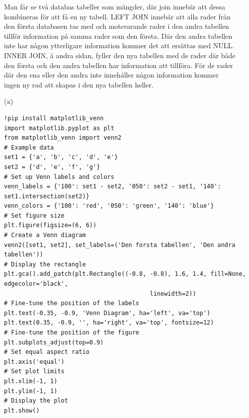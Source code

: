\documentclass[]{article}
\begin{document}
Man får se två databas tabeller som mängder, där join innebär att dessa \\
kombineras för att få en ny tabell. LEFT JOIN innebär att alla rader från \\
den första databasen tas med och motsvarande rader i den andra tabellen \\
tillför information på samma rader som den första. Där den andra tabellen \\
inte har någon ytterligare information kommer det att ersättas med NULL. \\
INNER JOIN, å andra sidan, fyller den nya tabellen med de rader där både \\
den första och den andra tabellen har information att tillföra. För de rader \\
där den ena eller den andra inte innehåller någon information kommer \\
ingen ny rad att skapas i den nya tabellen heller.
\if(x)
\begin{lstlisting}
!pip install matplotlib_venn
import matplotlib.pyplot as plt
from matplotlib_venn import venn2
# Example data
set1 = {'a', 'b', 'c', 'd', 'e'}
set2 = {'d', 'e', 'f', 'g'}
# Set up Venn labels and colors
venn_labels = {'100': set1 - set2, '050': set2 - set1, '140': set1.intersection(set2)}
venn_colors = {'100': 'red', '050': 'green', '140': 'blue'}
# Set figure size
plt.figure(figsize=(6, 6))
# Create a Venn diagram
venn2([set1, set2], set_labels=('Den forsta tabellen', 'Den andra tabellen'))
# Display the rectangle
plt.gca().add_patch(plt.Rectangle((-0.8, -0.8), 1.6, 1.4, fill=None, edgecolor='black', 
								   	     linewidth=2))
# Fine-tune the position of the labels
plt.text(-0.35, -0.9, 'Venn Diagram', ha='left', va='top')
plt.text(0.35, -0.9, '', ha='right', va='top', fontsize=12)
# Fine-tune the position of the figure
plt.subplots_adjust(top=0.9)
# Set equal aspect ratio
plt.axis('equal')
# Set plot limits
plt.xlim(-1, 1)
plt.ylim(-1, 1)
# Display the plot
plt.show()
\end{lstlisting}
\fi
\end{document}
